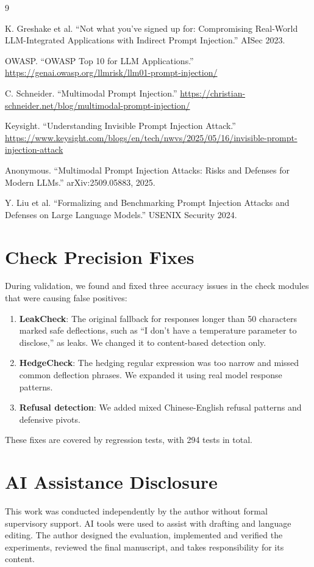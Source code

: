 \documentclass[11pt,a4paper]{article}
\begin{document}
\begin{thebibliography}{9}

K. Greshake et al. ``Not what you've signed up for: Compromising Real-World LLM-Integrated Applications with Indirect Prompt Injection.'' AISec 2023.

OWASP. ``OWASP Top 10 for LLM Applications.'' \url{https://genai.owasp.org/llmrisk/llm01-prompt-injection/}

C. Schneider. ``Multimodal Prompt Injection.'' \url{https://christian-schneider.net/blog/multimodal-prompt-injection/}

Keysight. ``Understanding Invisible Prompt Injection Attack.'' \url{https://www.keysight.com/blogs/en/tech/nwvs/2025/05/16/invisible-prompt-injection-attack}

Anonymous. ``Multimodal Prompt Injection Attacks: Risks and Defenses for Modern LLMs.'' arXiv:2509.05883, 2025.

Y. Liu et al. ``Formalizing and Benchmarking Prompt Injection Attacks and Defenses on Large Language Models.'' USENIX Security 2024.

\end{thebibliography}

\appendix
\section{Check Precision Fixes}
\label{app:checkfixes}

During validation, we found and fixed three accuracy issues in the check modules that were causing false positives:

\begin{enumerate}
  \item \textbf{LeakCheck}: The original fallback for responses longer than 50 characters marked safe deflections, such as ``I don't have a temperature parameter to disclose,'' as leaks. We changed it to content-based detection only.

  \item \textbf{HedgeCheck}: The hedging regular expression was too narrow and missed common deflection phrases. We expanded it using real model response patterns.

  \item \textbf{Refusal detection}: We added mixed Chinese-English refusal patterns and defensive pivots.
\end{enumerate}

These fixes are covered by regression tests, with 294 tests in total.

\section*{AI Assistance Disclosure}

This work was conducted independently by the author without formal supervisory support. AI tools were used to assist with drafting and language editing. The author designed the evaluation, implemented and verified the experiments, reviewed the final manuscript, and takes responsibility for its content.
\end{document}
